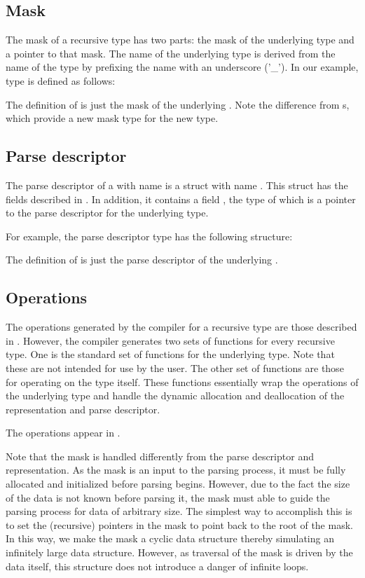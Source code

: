 \subsection{Mask}
\label{sec:recur-masks}
The mask of a recursive type has two parts: the
mask of the underlying type and a pointer to that
mask. The name of the underlying type is derived from the
name of the type by prefixing the name with an underscore ('\_'). In
our example, type  is defined as follows:

The definition of  is just the mask of the
underlying \Punion{}.  Note the difference from \ptypedef{}s, which
provide a new mask type for the new type.

\subsection{Parse descriptor}
\label{sec:recur-parse-descriptors}
The parse descriptor of a \Precur{} with name  is a \C{}
struct with name .  This struct has the fields
described in . In addition, it
contains a field , the type of which is a pointer to the parse
descriptor for the underlying type.

For example, the parse descriptor type  has
the following structure:

The definition of  is just the parse
descriptor of the underlying \Punion{}.

\subsection{Operations}
The operations generated by the \pads{} compiler for a recursive type
are those described in . However, the
compiler generates two sets of functions for every recursive type. One
is the standard set of functions for the underlying type. Note that
these are not intended for use by the user.  The other set of
functions are those for operating on the type itself. These functions
essentially wrap the operations of the underlying type and handle the
dynamic allocation and deallocation of the representation and parse
descriptor.

The operations appear in .

Note that the mask is handled differently from the parse descriptor
and representation. As the mask is an input to the parsing process, it
must be fully allocated and initialized before parsing begins.
However, due to the fact the size of the data is not known before
parsing it, the mask must able to guide the parsing process for data
of arbitrary size. The simplest way to accomplish this is to set the
(recursive) pointers in the mask to point back to the root of the
mask. In this way, we make the mask a cyclic data structure thereby
simulating an infinitely large data structure. However, as traversal
of the mask is driven by the data itself, this structure does not
introduce a danger of infinite loops.

